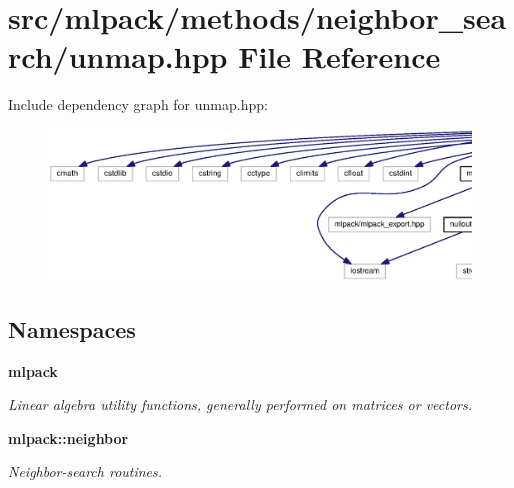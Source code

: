 \section{src/mlpack/methods/neighbor\+\_\+search/unmap.hpp File Reference}
\label{unmap_8hpp}
Include dependency graph for unmap.\+hpp\+:
\nopagebreak
\begin{figure}[H]
\begin{center}
\leavevmode
\includegraphics[width=350pt]{unmap_8hpp__incl}
\end{center}
\end{figure}
\subsection*{Namespaces}
\begin{DoxyCompactItemize}
\item 
 {\bf mlpack}
\begin{DoxyCompactList}\small\item\em Linear algebra utility functions, generally performed on matrices or vectors. \end{DoxyCompactList}\item 
 {\bf mlpack\+::neighbor}
\begin{DoxyCompactList}\small\item\em Neighbor-\/search routines. \end{DoxyCompactList}\end{DoxyCompactItemize}
